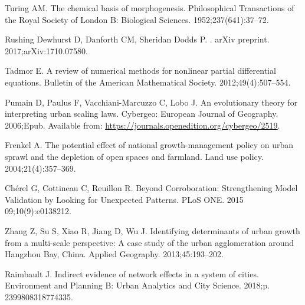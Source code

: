 \documentclass[10pt,letterpaper]{article}
\begin{document}
\begin{thebibliography}{10}
Turing AM.
\newblock The chemical basis of morphogenesis.
\newblock Philosophical Transactions of the Royal Society of London B:
  Biological Sciences. 1952;237(641):37--72.

{Rushing Dewhurst} D, {Danforth} CM, {Sheridan Dodds} P.
.
\newblock arXiv preprint. 2017;arXiv:1710.07580.

Tadmor E.
\newblock A review of numerical methods for nonlinear partial differential
  equations.
\newblock Bulletin of the American Mathematical Society. 2012;49(4):507--554.

Pumain D, Paulus F, Vacchiani-Marcuzzo C, Lobo J.
\newblock An evolutionary theory for interpreting urban scaling laws.
\newblock Cybergeo: European Journal of Geography. 2006;Epub.
\newblock Available from: \url{https://journals.openedition.org/cybergeo/2519}.

Frenkel A.
\newblock The potential effect of national growth-management policy on urban
  sprawl and the depletion of open spaces and farmland.
\newblock Land use policy. 2004;21(4):357--369.

Ch{\'e}rel G, Cottineau C, Reuillon R.
\newblock Beyond Corroboration: Strengthening Model Validation by Looking for
  Unexpected Patterns.
\newblock PLoS ONE. 2015 09;10(9):e0138212.

Zhang Z, Su S, Xiao R, Jiang D, Wu J.
\newblock Identifying determinants of urban growth from a multi-scale
  perspective: A case study of the urban agglomeration around Hangzhou Bay,
  China.
\newblock Applied Geography. 2013;45:193--202.

Raimbault J.
\newblock Indirect evidence of network effects in a system of cities.
\newblock Environment and Planning B: Urban Analytics and City Science. 2018;p.
  2399808318774335.

\end{thebibliography}
\end{document}
